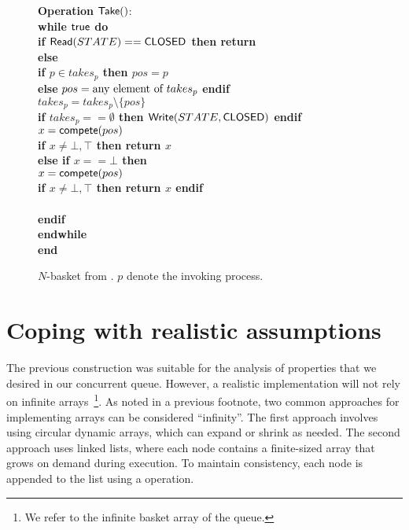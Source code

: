 \begin{figure}[ht!]
{{\begin{minipage}[t]{180mm}
\begin{tabbing}
{\bf Operation} ${\sf Take}()$: \\
 \> {\bf while \({\sf true}\) do}\\
 \> \> {\bf if \({\sf Read}(STATE) == {\sf CLOSED}\) then return \closed} \\
 \> \> {\bf else} \\
 \> \> \> {\bf if \(p \in takes_p\) then \(pos = p\)} \\
 \> \> \> {\bf else} \(pos = \hbox{any element of } takes_p\) {\bf endif} \\
 \> \> \> \(takes_p =  takes_p \setminus \{pos\}\) \\
 \> \> \> {\bf if \(takes_p == \emptyset\) then \({\sf Write}(STATE, {\sf CLOSED})\) endif} \\
 \> \> \> \( x = {\sf compete}(pos) \) \\
 \> \> \> {\bf if \(x \neq \bot, \top \) then return \(x\)} \\
 \> \> \> {\bf else if \(x == \bot\) then} \\
 \> \> \> \> \( x = {\sf compete}(pos) \) \\
 \> \> \> \> {\bf if \(x \neq \bot, \top \) then return \(x\) endif} \\
 \> \>  \\
 \> \> {\bf endif} \\
 \> {\bf endwhile}\\
{\bf end \Take}
\end{tabbing}
\end{minipage}}
\caption{\label{basket-2}$N$-basket from \CAS. $p$ denote the invoking process.}
}
\end{figure}

\section{\label{sec:coping-with-realistic-assumptions}Coping with realistic assumptions}

The previous construction was suitable for the analysis of properties that we desired in our concurrent queue. However, a realistic implementation will not rely on infinite arrays~\footnote{We refer to the infinite basket array of the queue.}. As noted in a previous footnote, two common approaches for implementing arrays can be considered ``infinity''. The first approach involves using circular dynamic arrays, which can expand or shrink as needed. The second approach uses linked lists, where each node contains a finite-sized array that grows on demand during execution. To maintain consistency, each node is appended to the list using a \CAS operation.

